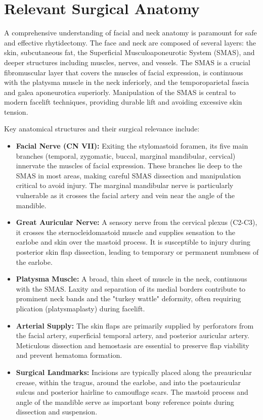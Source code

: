 \section*{Relevant Surgical Anatomy}
A comprehensive understanding of facial and neck anatomy is paramount for safe and effective rhytidectomy. The face and neck are composed of several layers: the skin, subcutaneous fat, the Superficial Musculoaponeurotic System (SMAS), and deeper structures including muscles, nerves, and vessels. The SMAS is a crucial fibromuscular layer that covers the muscles of facial expression, is continuous with the platysma muscle in the neck inferiorly, and the temporoparietal fascia and galea aponeurotica superiorly. Manipulation of the SMAS is central to modern facelift techniques, providing durable lift and avoiding excessive skin tension.

Key anatomical structures and their surgical relevance include:
\begin{itemize}
  \item \textbf{Facial Nerve (CN VII):} Exiting the stylomastoid foramen, its five main branches (temporal, zygomatic, buccal, marginal mandibular, cervical) innervate the muscles of facial expression. These branches lie deep to the SMAS in most areas, making careful SMAS dissection and manipulation critical to avoid injury. The marginal mandibular nerve is particularly vulnerable as it crosses the facial artery and vein near the angle of the mandible.
  \item \textbf{Great Auricular Nerve:} A sensory nerve from the cervical plexus (C2-C3), it crosses the sternocleidomastoid muscle and supplies sensation to the earlobe and skin over the mastoid process. It is susceptible to injury during posterior skin flap dissection, leading to temporary or permanent numbness of the earlobe.
  \item \textbf{Platysma Muscle:} A broad, thin sheet of muscle in the neck, continuous with the SMAS. Laxity and separation of its medial borders contribute to prominent neck bands and the "turkey wattle" deformity, often requiring plication (platysmaplasty) during facelift.
  \item \textbf{Arterial Supply:} The skin flaps are primarily supplied by perforators from the facial artery, superficial temporal artery, and posterior auricular artery. Meticulous dissection and hemostasis are essential to preserve flap viability and prevent hematoma formation.
  \item \textbf{Surgical Landmarks:} Incisions are typically placed along the preauricular crease, within the tragus, around the earlobe, and into the postauricular sulcus and posterior hairline to camouflage scars. The mastoid process and angle of the mandible serve as important bony reference points during dissection and suspension.
\end{itemize}

